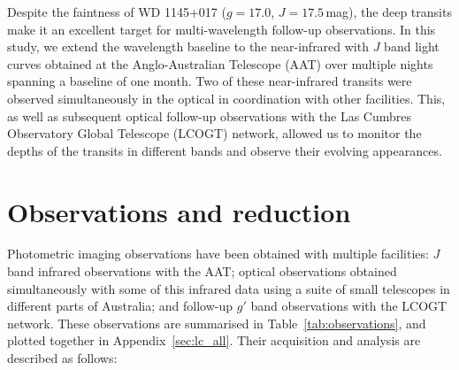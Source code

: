 \documentclass[useAMS,usenatbib]{mn2e}
\begin{document}
Despite the faintness of WD 1145+017 ($g=17.0$, $J=17.5$\,mag), the deep transits make it an excellent target for multi-wavelength follow-up observations. In this study, we extend the wavelength baseline to the near-infrared with $J$ band light curves obtained at the Anglo-Australian Telescope (AAT) over multiple nights spanning a baseline of one month. Two of these near-infrared transits were observed simultaneously in the optical in coordination with other facilities. This, as well as subsequent optical follow-up observations with the Las Cumbres Observatory Global Telescope (LCOGT) network, allowed us to monitor the depths of the transits in different bands and observe their evolving appearances.

\section{Observations and reduction}
\label{sec:observations}

Photometric imaging observations have been obtained with multiple facilities: $J$ band infrared observations with the AAT; optical observations obtained simultaneously with some of this infrared data using a suite of small telescopes in different parts of Australia; and follow-up $g'$ band observations with the LCOGT network. These observations are summarised in Table~\ref{tab:observations}, and plotted together in Appendix~\ref{sec:lc_all}. Their acquisition and analysis are described as follows:
\end{document}
